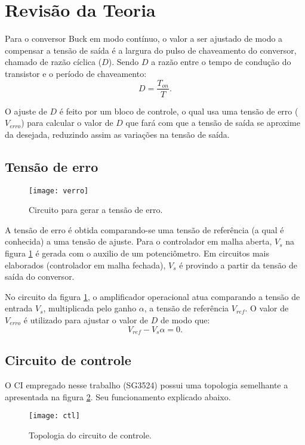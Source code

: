 \newpage
\section{Revisão da Teoria}

Para o conversor Buck em modo contínuo, o valor a ser ajustado de modo a compensar a tensão de saída é a largura do pulso de chaveamento do conversor, chamado de razão cíclica ($D$). Sendo $D$ a razão entre o tempo de condução do transistor e o período de chaveamento:
\[
    D = \frac{T_{on}}{T}.
\]

O ajuste de $D$ é feito por um bloco de controle, o qual usa uma tensão de erro ($V_{erro}$) para calcular o valor de $D$ que fará com que a tensão de saída se aproxime da desejada, reduzindo assim as variações na tensão de saída.

\subsection{Tensão de erro}

\begin{figure}[H]
    \centering
    \caption{Circuito para gerar a tensão de erro.}
    \texttt{[image: verro]}
    \label{fig:verro}
\end{figure}

A tensão de erro é obtida comparando-se uma tensão de referência (a qual é conhecida) a uma tensão de ajuste. Para o controlador em malha aberta, $V_s$ na figura \ref{fig:verro} é gerada com o auxilio de um potenciômetro. Em circuitos mais elaborados (controlador em malha fechada), $V_s$ é provindo a partir da tensão de saída do conversor.

No circuito da figura \ref{fig:verro}, o amplificador operacional atua comparando a tensão de entrada $V_s$, multiplicada pelo ganho $\alpha$, a tensão de referência $V_{ref}$. O valor de $V_{erro}$ é utilizado para ajustar o valor de $D$ de modo que:
\[
    V_{ref} - V_s \alpha = 0.
\]

\subsection{Circuito de controle}

O CI empregado nesse trabalho (SG3524) possui uma topologia semelhante a apresentada na figura \ref{fig:ctl}. Seu funcionamento explicado abaixo.

\begin{figure}[H]
    \centering
    \caption{Topologia do circuito de controle.}
    \texttt{[image: ctl]}
    \label{fig:ctl}
\end{figure}

